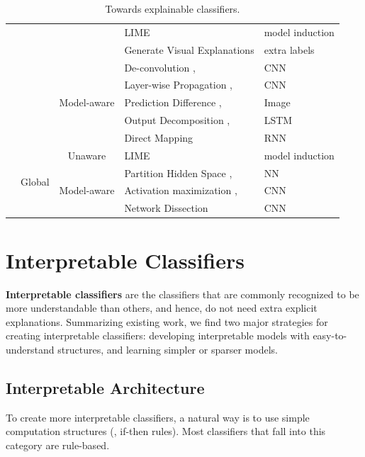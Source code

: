 \begin{table}[hb]
\begin{tabular}{ |c|c|c|p{15em}|p{7.5em}| }
  \cline{4-5}
  & & & LIME \cite{ribeiro2016kdd} & model induction \\ 
  \cline{4-5}
  & & & Generate Visual Explanations \cite{hendricks16generate} & extra labels \\ 
  \cline{3-5}
  & & \multirow{5}{4em}{\centering Model-aware}
  & De-convolution \cite{zeiler2014eccv}, & CNN \\
  & & & Layer-wise Propagation \cite{bach15plos}, & CNN \\
  & & & Prediction Difference \cite{zintgraf17visualize}, & Image \\
  & & & Output Decomposition \cite{murdoch2017rule}, & LSTM \\
  & & & Direct Mapping \cite{karpathy16rnn} & RNN \\
  \cline{2-5}
  & \multirow{4}{3em}{\centering Global} & \multirow{1}{4em}{\centering Unaware}
  & LIME \cite{ribeiro2016kdd} & model induction  \\ 
  \cline{3-5}
  & & \multirow{3}{4em}{\centering Model-aware}
  & Partition Hidden Space \cite{feraud2002nn,rauber2017hidden-activity}, & NN \\
  & & & Activation maximization \cite{erhan2009techreport}, & CNN \\
  & & & Network Dissection \cite{bau2017netdissect} & CNN \\
  \hline
\end{tabular}
\caption{Towards explainable classifiers.}
\label{tab:explainable-methods}
\end{table}

\section{Interpretable Classifiers}\label{sec:interpretable-classifier}

\textbf{Interpretable classifiers} are the classifiers that are commonly recognized to be more understandable than others, and hence, do not need extra explicit explanations. Summarizing existing work, we find two major strategies for creating interpretable classifiers: developing interpretable models with easy-to-understand structures, and learning simpler or sparser models.

\subsection{Interpretable Architecture}

To create more interpretable classifiers, a natural way is to use simple computation structures (\eg, if-then rules). Most classifiers that fall into this category are rule-based. 

